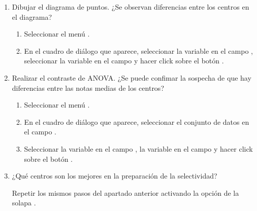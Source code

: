 \begin {enumerate}[leftmargin=*]
\begin{enumerate}
\item Dibujar el diagrama de puntos. ¿Se observan diferencias entre los centros en el diagrama?
\begin{indicacion}{
\begin{enumerate}
\item Seleccionar el menú .
\item En el cuadro de diálogo que aparece, seleccionar la variable  en el campo , seleccionar la
variable  en el campo  y hacer click sobre el botón .
\end{enumerate}
}
\end{indicacion}

\item Realizar el contraste de ANOVA. 
¿Se puede confimar la sospecha de que hay diferencias entre las notas medias de los centros?
\begin{indicacion}{
\begin{enumerate}
\item Seleccionar el menú .
\item En el cuadro de diálogo que aparece, seleccionar el conjunto de datos  en el campo .
\item Seleccionar la variable  en el campo , la variable
 en el campo  y hacer click sobre el botón .
\end{enumerate}}
\end{indicacion}

\item ¿Qué centros son los mejores en la preparación de la selectividad?
\begin{indicacion}{ 
Repetir los mismos pasos del apartado anterior activando la opción  de la solapa .}
\end{indicacion}
\end{enumerate}

\end{enumerate}


